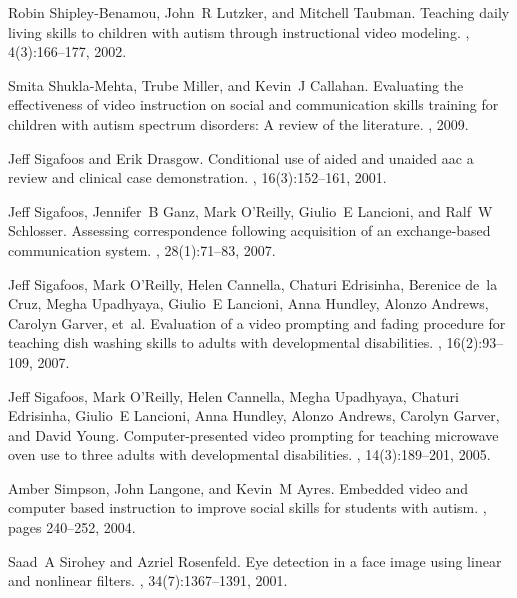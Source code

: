 \documentclass{ut-thesis}
\begin{document}
\begin{thebibliography}{100}
Robin Shipley-Benamou, John~R Lutzker, and Mitchell Taubman.
\newblock Teaching daily living skills to children with autism through
  instructional video modeling.
, 4(3):166--177,
  2002.

Smita Shukla-Mehta, Trube Miller, and Kevin~J Callahan.
\newblock Evaluating the effectiveness of video instruction on social and
  communication skills training for children with autism spectrum disorders: A
  review of the literature.
, 2009.

Jeff Sigafoos and Erik Drasgow.
\newblock Conditional use of aided and unaided aac a review and clinical case
  demonstration.
,
  16(3):152--161, 2001.

Jeff Sigafoos, Jennifer~B Ganz, Mark O’Reilly, Giulio~E Lancioni, and Ralf~W
  Schlosser.
\newblock Assessing correspondence following acquisition of an exchange-based
  communication system.
, 28(1):71--83, 2007.

Jeff Sigafoos, Mark O’Reilly, Helen Cannella, Chaturi Edrisinha, Berenice
  de~la Cruz, Megha Upadhyaya, Giulio~E Lancioni, Anna Hundley, Alonzo Andrews,
  Carolyn Garver, et~al.
\newblock Evaluation of a video prompting and fading procedure for teaching
  dish washing skills to adults with developmental disabilities.
, 16(2):93--109, 2007.

Jeff Sigafoos, Mark O’Reilly, Helen Cannella, Megha Upadhyaya, Chaturi
  Edrisinha, Giulio~E Lancioni, Anna Hundley, Alonzo Andrews, Carolyn Garver,
  and David Young.
\newblock Computer-presented video prompting for teaching microwave oven use to
  three adults with developmental disabilities.
, 14(3):189--201, 2005.

Amber Simpson, John Langone, and Kevin~M Ayres.
\newblock Embedded video and computer based instruction to improve social
  skills for students with autism.
, pages
  240--252, 2004.

Saad~A Sirohey and Azriel Rosenfeld.
\newblock Eye detection in a face image using linear and nonlinear filters.
, 34(7):1367--1391, 2001.


\end{thebibliography}
\end{document}
